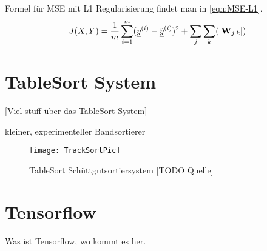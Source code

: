 Formel für MSE mit L1 Regularisierung findet man in \ref{eqn:MSE-L1}.
\begin{equation} \label{eqn:MSE-L1}
	J(X, Y) = \frac{1}{m} \sum_{i=1}^{m} ({\underline{y}}^{(i)} - \hat{{\underline{y}}}^{(i)})^2 + \sum_{j} \sum_{k} (|{{\mathbf{W}}}_{j,k}|)
\end{equation} 



\section{TableSort System}

[Viel stuff über das TableSort System]

kleiner, experimenteller Bandsortierer \cite{doll2015}

\begin{figure}
	\texttt{[image: TrackSortPic]}
	\caption{TableSort Schüttgutsortiersystem [TODO Quelle]}
	\label{fig:tablesortsystem}
\end{figure}


\section{Tensorflow}

Was ist Tensorflow, wo kommt es her.
